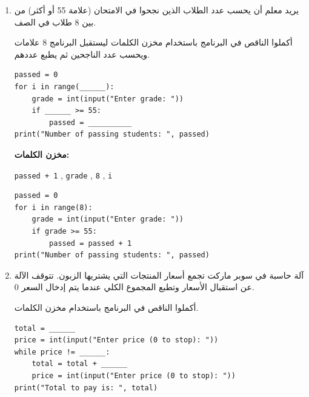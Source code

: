 \documentclass[14pt]{extarticle}
\begin{document}
\begin{enumerate}[itemsep=3em]
\clearpage

\item يريد معلم أن يحسب عدد الطلاب الذين نجحوا في الامتحان (علامة 55 أو أكثر) من بين 8 طلاب في الصف.

أكملوا الناقص في البرنامج باستخدام مخزن الكلمات ليستقبل البرنامج 8 علامات ويحسب عدد الناجحين ثم يطبع عددهم.

\begin{boxCode}
\begin{english}
\begin{verbatim}
passed = 0
for i in range(______):
    grade = int(input("Enter grade: "))
    if ______ >= 55:
        passed = __________
print("Number of passing students: ", passed)
\end{verbatim}
\end{english}
\end{boxCode}

\textbf{مخزن الكلمات:}
\begin{center}
\begin{english}
\begin{boxCode}
\texttt{passed + 1} \quad , \quad \texttt{grade} \quad , \quad \texttt{8} \quad , \quad \texttt{i}
\end{boxCode}
\end{english}
\end{center}

\ifwithsols
\begin{boxSolution}
\begin{english}
\begin{verbatim}
passed = 0
for i in range(8):
    grade = int(input("Enter grade: "))
    if grade >= 55:
        passed = passed + 1
print("Number of passing students: ", passed)
\end{verbatim}
\end{english}
\end{boxSolution}
\fi


\item آلة حاسبة في سوبر ماركت تجمع أسعار المنتجات التي يشتريها الزبون. تتوقف الآلة عن استقبال الأسعار وتطبع المجموع الكلي عندما يتم إدخال السعر 0.

أكملوا الناقص في البرنامج باستخدام مخزن الكلمات.

\begin{boxCode}
\begin{english}
\begin{verbatim}
total = ______
price = int(input("Enter price (0 to stop): "))
while price != ______:
    total = total + ______
    price = int(input("Enter price (0 to stop): "))
print("Total to pay is: ", total)
\end{verbatim}
\end{english}
\end{boxCode}


\end{enumerate}
\end{document}
